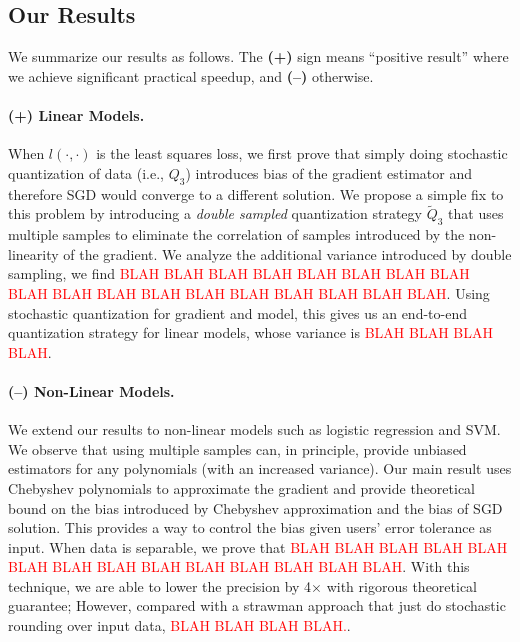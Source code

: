 \documentclass{article}
\begin{document}
\vspace{-1em}
\subsection{Our Results}

We summarize our results as follows. The {\bf (+)}
sign means ``positive result'' where we achieve
significant practical speedup, and {\bf (--)} otherwise.

\vspace{-1em}
\paragraph{(+) Linear Models.} When $l(\cdot,\cdot)$ is 
the least squares loss, we first prove that
simply doing stochastic quantization of data 
(i.e., $Q_3$) introduces bias of the gradient
estimator and therefore SGD would converge
to a different solution. We propose a simple
fix to this problem by introducing a
{\em double sampled} quantization strategy
$\tilde{Q}_3$ that uses multiple samples to
eliminate the correlation of samples introduced
by the non-linearity of the gradient. We
analyze the additional variance introduced
by double sampling, we find \textcolor{red}{
BLAH BLAH BLAH BLAH BLAH BLAH BLAH BLAH BLAH BLAH BLAH BLAH
BLAH BLAH BLAH BLAH BLAH BLAH}. Using
stochastic quantization for gradient and model,
this gives us an end-to-end quantization strategy
for linear models, whose variance is \textcolor{red}{
BLAH BLAH BLAH BLAH}.

\vspace{-1em}
\paragraph{(--) Non-Linear Models.} We extend our
results to non-linear models such as
logistic regression and SVM. We observe that
using multiple samples can, in principle,
provide unbiased estimators for any polynomials
(with an increased variance). Our main
result uses Chebyshev polynomials to
approximate the gradient and provide theoretical
bound on the bias introduced by Chebyshev
approximation and the bias of SGD solution. 
This provides a way to control the bias given
users' error tolerance as input.  
When data is separable,
we prove that \textcolor{red}{BLAH BLAH 
BLAH BLAH BLAH BLAH BLAH BLAH BLAH BLAH BLAH 
BLAH BLAH BLAH}. With this technique, we are
able to lower the precision by 4$\times$ with
rigorous theoretical guarantee; However,
compared with a strawman approach that just
do stochastic rounding over input data, 
\textcolor{red}{BLAH BLAH BLAH BLAH.}.
\end{document}
